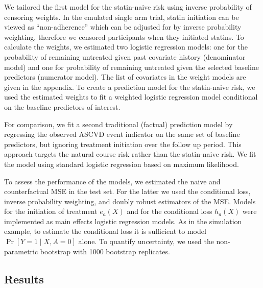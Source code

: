 We tailored the first model for the statin-naive risk using inverse probability of censoring weights. In the emulated single arm trial, statin initiation can be viewed as ``non-adherence'' which can be adjusted for by inverse probability weighting, therefore we censored participants when they initiated statins. To calculate the weights, we estimated two logistic regression models: one for the probability of remaining untreated given past covariate history (denominator model) and one for probability of remaining untreated given the selected baseline predictors (numerator model). The list of covariates in the weight models are given in the appendix. To create a prediction model for the statin-naive risk, we used the estimated weights to fit a weighted logistic regression model conditional on the baseline predictors of interest. 

For comparison, we fit a second traditional (factual) prediction model by regressing the observed ASCVD event indicator on the same set of baseline predictors, but ignoring treatment initiation over the follow up period. This approach targets the natural course risk rather than the statin-naive risk. We fit the model using standard logistic regression based on maximum likelihood.

To assess the performance of the models, we estimated the naive and counterfactual MSE in the test set. For the latter we used the conditional loss, inverse probability weighting, and doubly robust estimators of the MSE. Models for the initiation of treatment $e_a(X)$ and for the conditional loss $h_a(X)$ were implemented as main effects logistic regression models. As in the simulation example, to estimate the conditional loss it is sufficient to model $\operatorname{Pr}[Y=1 \mid X, A=0]$ alone. To quantify uncertainty, we used the non-parametric bootstrap with 1000 bootstrap replicates.

\subsection{Results}

